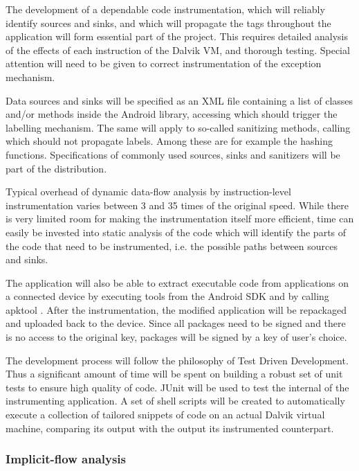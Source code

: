 \documentclass[12pt]{article}
\begin{document}

The development of a dependable code instrumentation, which will reliably 
identify sources and sinks, and which will propagate the tags throughout 
the application will form essential part of the project. This requires 
detailed analysis of the effects of each instruction of the Dalvik VM, and 
thorough testing. Special attention will need to be given to correct 
instrumentation of the exception mechanism.

Data sources and sinks will be specified as an XML file containing a list
of classes and/or methods inside the Android library, accessing which
should trigger the labelling mechanism. The same will apply to so-called 
sanitizing methods, calling which should not propagate labels. Among these
are for example the hashing functions. Specifications of commonly used 
sources, sinks and sanitizers will be part of the distribution.

Typical overhead of dynamic data-flow analysis by instruction-level 
instrumentation varies between 3 and 35 times of the original speed. While 
there is very limited room for making the instrumentation itself more 
efficient, time can easily be invested into static analysis of the code which 
will identify the parts of the code that need to be instrumented, i.e. the 
possible paths between sources and sinks. 

The application will also be able to extract executable code from 
applications on a connected device by executing tools from the Android SDK
and by calling apktool \cite{code.google.com/p/android-apktool}. After the 
instrumentation, the modified application will be repackaged and uploaded back 
to the device. Since all packages need to be signed and there is no access to 
the original key, packages will be signed by a key of user's choice.

The development process will follow the philosophy of Test Driven 
Development. Thus a significant amount of time will be spent on building 
a robust set of unit tests to ensure high quality of code. JUnit will be 
used to test the internal of the instrumenting application. A set of 
shell scripts will be created to automatically execute a collection
of tailored snippets of code on an actual Dalvik virtual machine, 
comparing its output with the output its instrumented counterpart.

\subsubsection*{Implicit-flow analysis}
\end{document}
